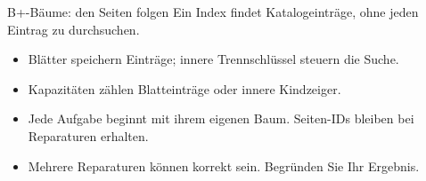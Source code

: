 \documentclass[aspectratio=169]{beamer}
\begin{document}
\begin{frame}{B+-Bäume: den Seiten folgen}
Ein Index findet Katalogeinträge, ohne jeden Eintrag zu durchsuchen.
\begin{itemize}\item Blätter speichern Einträge; innere Trennschlüssel steuern die Suche.
\item Kapazitäten zählen Blatteinträge oder innere Kindzeiger.
\item Jede Aufgabe beginnt mit ihrem eigenen Baum. Seiten-IDs bleiben bei Reparaturen erhalten.
\item Mehrere Reparaturen können korrekt sein. Begründen Sie Ihr Ergebnis.\end{itemize}
\end{frame}
\begin{frame}
\end{frame}
\begin{frame}
\end{frame}
\begin{frame}
\end{frame}
\begin{frame}
\end{frame}
\begin{frame}
\end{frame}
\begin{frame}
\end{frame}
\end{document}
